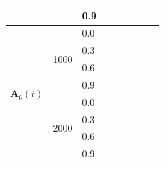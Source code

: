 \begin{table}[htbp]
{\begin{tabular}{lll|cc|cc|cc}
 &  & 0.9 &  &  &  &  &  &  \\
\hline
\multirow{8}{*}{$\mathbf{A}_6(t)$} & \multirow{4}{*}{1000} & 0.0 &  &  &  &  &  &  \\
 &  & 0.3 &  &  &  &  &  &  \\
 &  & 0.6 &  &  &  &  &  &  \\
 &  & 0.9 &  &  &  &  &  &  \\
\cline{2-9}
 & \multirow{4}{*}{2000} & 0.0 &  &  &  &  &  &  \\
 &  & 0.3 &  &  &  &  &  &  \\
 &  & 0.6 &  &  &  &  &  &  \\
 &  & 0.9 &  &  &  &  &  &  \\
\hline
\end{tabular}%
}
\end{table}

